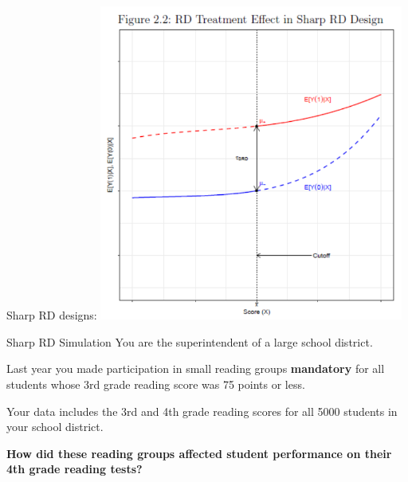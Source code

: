 \documentclass[
  ignorenonframetext,
]{beamer}
\begin{document}
\begin{frame}{Sharp RD designs:}
\protect\hypertarget{sharp-rd-designs}{}
\includegraphics[width=0.75\textwidth,height=\textheight]{"images/sharpRD2.png"}
\end{frame}

\begin{frame}{Sharp RD Simulation}
\protect\hypertarget{sharp-rd-simulation}{}
You are the superintendent of a large school district.

Last year you made participation in small reading groups
\textbf{mandatory} for all students whose 3rd grade reading score was 75
points or less.

Your data includes the 3rd and 4th grade reading scores for all 5000
students in your school district.

\textbf{How did these reading groups affected student performance on
their 4th grade reading tests?}
\end{frame}
\end{document}

